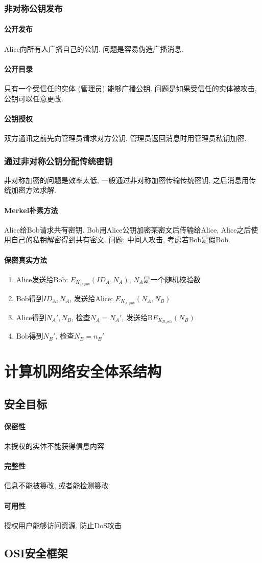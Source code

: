 \documentclass{ctexart}
\begin{document}
\subsubsection{非对称公钥发布}
\paragraph{公开发布} Alice向所有人广播自己的公钥. 问题是容易伪造广播消息.
\paragraph{公开目录} 只有一个受信任的实体 (管理员) 能够广播公钥. 问题是如果受信任的实体被攻击, 公钥可以任意更改.
\paragraph{公钥授权} 双方通讯之前先向管理员请求对方公钥, 管理员返回消息时用管理员私钥加密.
\subsubsection{通过非对称公钥分配传统密钥}
    非对称加密的问题是效率太低, 一般通过非对称加密传输传统密钥, 之后消息用传统加密方法求解.
\paragraph{Merkel朴素方法} Alice给Bob请求共有密钥. Bob用Alice公钥加密某密文后传输给Alice, Alice之后使用自己的私钥解密得到共有密文.
    问题: 中间人攻击, 考虑若Bob是假Bob.
\paragraph{保密真实方法} \begin{enumerate}
        \item Alice发送给Bob: $E_{K_{B, pub}}(ID_A, N_A)$, $N_A$是一个随机校验数
        \item Bob得到$ID_A, N_A$, 发送给Alice: $E_{K_{A, pub}}(N_A, N_B)$
        \item Alice得到$N_A', N_B$, 检查$N_A = N_A'$, 发送给B$E_{K_{B, pub}}(N_B)$
        \item Bob得到$N_B'$, 检查$N_B = n_B'$
    \end{enumerate}


\section{计算机网络安全体系结构}
\subsection{安全目标}
\paragraph{保密性} 未授权的实体不能获得信息内容
\paragraph{完整性} 信息不能被篡改, 或者能检测篡改
\paragraph{可用性} 授权用户能够访问资源, 防止DoS攻击

\subsection{OSI安全框架}
\end{document}
